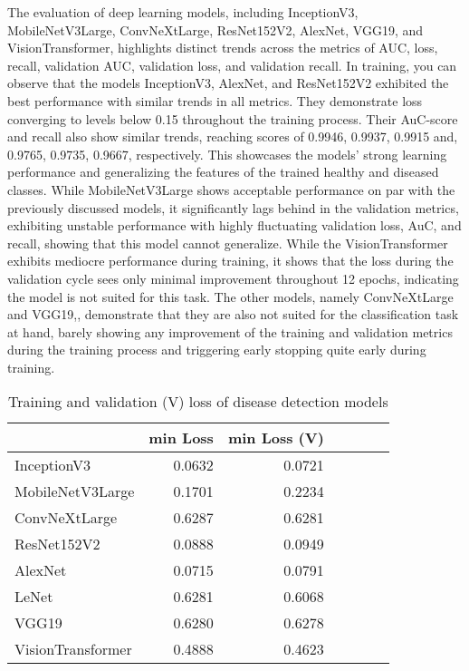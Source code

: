 \documentclass[draft,final]{vutinfth} %
\begin{document}
\begin{appendix}
The evaluation of deep learning models, including InceptionV3, MobileNetV3Large, ConvNeXtLarge, ResNet152V2, AlexNet, VGG19, and VisionTransformer, highlights distinct trends across the metrics of AUC, loss, recall, validation AUC, validation loss, and validation recall. In training, you can observe that the models InceptionV3, AlexNet, and ResNet152V2 exhibited the best performance with similar trends in all metrics. They demonstrate loss converging to levels below 0.15 throughout the training process. Their AuC-score and recall also show similar trends, reaching scores of 0.9946, 0.9937, 0.9915 and, 0.9765, 0.9735, 0.9667, respectively. This showcases the models' strong learning performance and generalizing the features of the trained healthy and diseased classes. While MobileNetV3Large shows acceptable performance on par with the previously discussed models, it significantly lags behind in the validation metrics, exhibiting unstable performance with highly fluctuating validation loss, AuC, and recall, showing that this model cannot generalize. While the VisionTransformer exhibits mediocre performance during training, it shows that the loss during the validation cycle sees only minimal improvement throughout 12 epochs, indicating the model is not suited for this task. The other models, namely ConvNeXtLarge and VGG19,, demonstrate that they are also not suited for the classification task at hand, barely showing any improvement of the training and validation metrics during the training process and triggering early stopping quite early during training.

\begin{table}[]
    \centering
    \begin{tabular}{lrrrrrr}
    \toprule
    & min Loss & min Loss (V) \\
    \midrule
    InceptionV3 & 0.0632 & 0.0721 \\
    MobileNetV3Large & 0.1701 & 0.2234 \\
    ConvNeXtLarge & 0.6287 & 0.6281 \\
    ResNet152V2 & 0.0888 & 0.0949 \\
    AlexNet & 0.0715 & 0.0791 \\
    LeNet & 0.6281 & 0.6068 \\
    VGG19 & 0.6280 & 0.6278 \\
    VisionTransformer & 0.4888 & 0.4623 \\
    \bottomrule
    \end{tabular}
    \caption{Training and validation (V) loss of disease detection models}
    \label{tab:disease_detection_losses}
\end{table}


\end{appendix}
\end{document}
